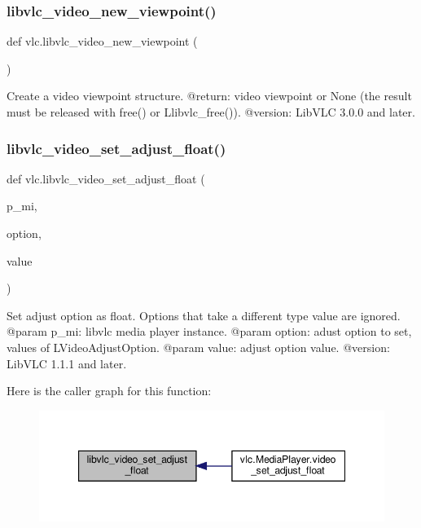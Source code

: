 \subsubsection{\texorpdfstring{libvlc\+\_\+video\+\_\+new\+\_\+viewpoint()}{libvlc\_video\_new\_viewpoint()}}
{\footnotesize\ttfamily def vlc.\+libvlc\+\_\+video\+\_\+new\+\_\+viewpoint (\begin{DoxyParamCaption}{ }\end{DoxyParamCaption})}

\begin{DoxyVerb}Create a video viewpoint structure.
@return: video viewpoint or None (the result must be released with free() or L{libvlc_free}()).
@version: LibVLC 3.0.0 and later.
\end{DoxyVerb}
 \mbox{\label{namespacevlc_ae64d6c4f5dad0c6b67e7eae0b4e1d2e3}} 
\subsubsection{\texorpdfstring{libvlc\+\_\+video\+\_\+set\+\_\+adjust\+\_\+float()}{libvlc\_video\_set\_adjust\_float()}}
{\footnotesize\ttfamily def vlc.\+libvlc\+\_\+video\+\_\+set\+\_\+adjust\+\_\+float (\begin{DoxyParamCaption}\item[{}]{p\+\_\+mi,  }\item[{}]{option,  }\item[{}]{value }\end{DoxyParamCaption})}

\begin{DoxyVerb}Set adjust option as float. Options that take a different type value
are ignored.
@param p_mi: libvlc media player instance.
@param option: adust option to set, values of L{VideoAdjustOption}.
@param value: adjust option value.
@version: LibVLC 1.1.1 and later.
\end{DoxyVerb}
 Here is the caller graph for this function\+:
\nopagebreak
\begin{figure}[H]
\begin{center}
\leavevmode
\includegraphics[width=347pt]{namespacevlc_ae64d6c4f5dad0c6b67e7eae0b4e1d2e3_icgraph}
\end{center}
\end{figure}
\mbox{\label{namespacevlc_ad26714380b95c5d52496d67b570860ee}} 
